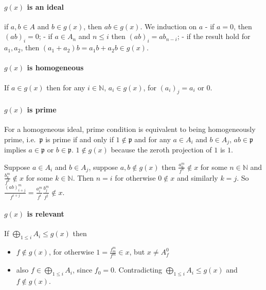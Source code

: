 \documentclass[11pt]{article}
\providecommand{\tightlist}{%
      \setlength{\itemsep}{0pt}\setlength{\parskip}{0pt}}
\begin{document}
    \hypertarget{gx-is-an-ideal}{%
\paragraph{\texorpdfstring{\(g(x)\) is an
ideal}{g(x) is an ideal}}\label{gx-is-an-ideal}}

if \(a, b \in A\) and \(b\in g(x)\), then \(ab\in g(x)\). We induction
on \(a\) - if \(a = 0\), then \((ab)_i=0\); - if \(a\in A_n\) and
\(n\le i\) then \((ab)_i=ab_{n-i}\); - if the result hold for
\(a_1, a_2\), then \((a_1+a_2)b=a_1b+a_2b\in g(x)\).

    \hypertarget{gx-is-homogeneous}{%
\paragraph{\texorpdfstring{\(g(x)\) is
homogeneous}{g(x) is homogeneous}}\label{gx-is-homogeneous}}

If \(a\in g(x)\) then for any \(i\in\mathbb N\), \(a_i\in g(x)\), for
\(\left(a_i\right)_j=a_i\) or \(0\).

    \hypertarget{gx-is-prime}{%
\paragraph{\texorpdfstring{\(g(x)\) is
prime}{g(x) is prime}}\label{gx-is-prime}}

For a homogeneous ideal, prime condition is equivalent to being
homogeneously prime, i.e.~\(\mathfrak p\) is prime if and only if
\(1\not\in\mathfrak p\) and for any \(a\in A_i\) and \(b\in A_j\),
\(ab\in\mathfrak p\) implies \(a\in\mathfrak p\) or \(b\in\mathfrak p\).
\(1 \not\in g(x)\) because the zeroth projection of \(1\) is \(1\).

Suppose \(a\in A_i\) and \(b\in A_j\), suppose \(a,b\not\in g(x)\) then
\(\frac{a_n^m}{f^n}\not\in x\) for some \(n\in\mathbb N\) and
\(\frac{b_k^m}{f^k}\not\in x\) for some \(k\in\mathbb N\). Then \(n=i\)
for otherwise \(0\not\in x\) and similarly \(k=j\). So
\(\frac{(ab)_{i+j}^m}{f^{i+j}}=\frac{a_i^m}{f^i}\frac{b_j^m}{f^j}\not\in x\).

    \hypertarget{gx-is-relevant}{%
\paragraph{\texorpdfstring{\(g(x)\) is
relevant}{g(x) is relevant}}\label{gx-is-relevant}}

If \(\bigoplus_{1\le i}A_i\le g(x)\) then

\begin{itemize}
\tightlist
\item
  \(f\not\in g(x)\), for otherwise \(1=\frac{f_m^m}{f^m}\in x\), but
  \(x\ne A^0_f\)
\item
  also \(f\in\bigoplus_{1\le i}A_i\), since \(f_0=0\). Contradicting
  \(\bigoplus_{1\le i}A_i\le g(x)\) and \(f\not\in g(x)\).
\end{itemize}
\end{document}
